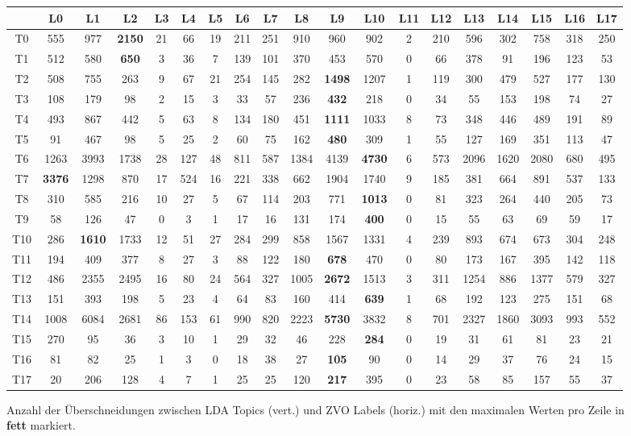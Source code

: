 \documentclass[german,version-2020-11]{uzl-thesis}
\begin{document}
\begin{figure}[H]
\begin{center}
\tiny
\renewcommand{\arraystretch}{2}
\begin{tabular}{ccccccccccccccccccc}
\hline
\hline 
&L0&L1&L2&L3&L4&L5&L6&L7&L8&L9&L10&L11&L12&L13&L14&L15&L16&L17\\
\hline
\hline
T0&555& 977& \textbf{2150}& 21& 66& 19& 211& 251& 910& 960& 902& 2& 210& 596& 302& 758& 318& 250\\
\hline 
T1&512& 580& \textbf{650}& 3& 36& 7& 139& 101& 370& 453& 570& 0& 66& 378& 91& 196& 123& 53\\
\hline 
T2&508& 755& 263& 9& 67& 21& 254& 145& 282& \textbf{1498}& 1207& 1& 119& 300& 479& 527& 177& 130\\
\hline 
T3&108& 179& 98& 2& 15& 3& 33& 57& 236& \textbf{432}& 218& 0& 34& 55& 153& 198& 74& 27\\
\hline 
T4&493& 867& 442& 5& 63& 8& 134& 180& 451& \textbf{1111}& 1033& 8& 73& 348& 446& 489& 191& 89\\
\hline 
T5&91& 467& 98& 5& 25& 2& 60& 75& 162& \textbf{480}& 309& 1& 55& 127& 169& 351& 113& 47\\
\hline 
T6&1263& 3993& 1738& 28& 127& 48& 811& 587& 1384& 4139& \textbf{4730}& 6& 573& 2096& 1620& 2080& 680& 495\\
\hline 
T7&\textbf{3376}& 1298& 870& 17& 524& 16& 221& 338& 662& 1904& 1740& 9& 185& 381& 664& 891& 537& 133\\
\hline 
T8&310& 585& 216& 10& 27& 5& 67& 114& 203& 771 & \textbf{1013}& 0& 81& 323& 264& 440& 205& 73\\
\hline 
T9&58& 126& 47& 0& 3& 1& 17& 16& 131& 174& \textbf{400}& 0& 15& 55& 63& 69& 59& 17\\
\hline 
T10&286& \textbf{1610}& 1733& 12& 51& 27& 284& 299& 858& 1567& 1331& 4& 239& 893& 674& 673& 304& 248\\
\hline 
T11&194& 409& 377& 8& 27& 3& 88& 122& 180& \textbf{678}& 470& 0& 80& 173& 167& 395& 142& 118\\
\hline 
T12&486& 2355& 2495& 16& 80& 24& 564& 327& 1005& \textbf{2672}& 1513& 3& 311& 1254& 886& 1377& 579& 327\\
\hline 
T13&151& 393& 198& 5& 23& 4& 64& 83& 160& 414& \textbf{639}& 1& 68& 192& 123& 275& 151& 68\\
\hline 
T14&1008& 6084& 2681& 86& 153& 61& 990& 820& 2223& \textbf{5730}& 3832& 8& 701& 2327& 1860& 3093& 993& 552\\
\hline 
T15&270& 95& 36& 3& 10& 1& 29& 32& 46& 228& \textbf{284}& 0& 19& 31& 61& 81& 23& 21\\
\hline 
T16&81& 82& 25& 1& 3& 0& 18& 38& 27& \textbf{105}& 90& 0& 14& 29& 37& 76& 24& 15\\
\hline
T17&20& 206& 128& 4& 7& 1& 25& 25& 120& \textbf{217}& 395& 0& 23& 58& 85& 157& 55& 37\\
\hline
\hline
\end{tabular}
\caption{Anzahl der Überschneidungen zwischen LDA Topics (vert.) und ZVO Labels (horiz.) mit den maximalen Werten pro Zeile in \textbf{fett} markiert.}
\label{fig:matrixnormal}
\end{center}
\end{figure}\\
\end{document}
